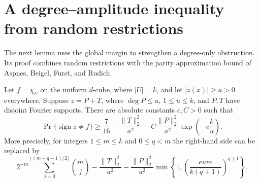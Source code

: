 \section{A degree--amplitude inequality from random restrictions}
\label{sec:random-restriction}
The next lemma uses the global margin to strengthen a degree-only
obstruction. Its proof combines random restrictions with the parity
approximation bound of Aspnes, Beigel, Furst, and Rudich.

\begin{lemma}
\label{cor:restriction-amplitude}
\label{lem:random-restriction-exact}
Let $f=\chi_U$ on the uniform $d$-cube, where $|U|=k$, and let
$|z(x)|\ge a>0$ everywhere. Suppose $z=P+T$, where $\deg P\le u$,
$1\le u\le k$, and $P,T$ have disjoint Fourier supports. There are
absolute constants $c,C>0$ such that
\begin{equation}
 \Pr\{\operatorname{sign}z\ne f\}
 \ge \frac7{16}-\frac{\|T\|_2^2}{a^2}
       -C\frac{\|P\|_2^2}{a^2}\exp\!\left(-c\frac{k}{u}\right).
 \label{eq:restriction-amplitude}
\end{equation}
More precisely, for integers $1\le m\le k$ and $0\le q<m$ the right-hand
side can be replaced by
\begin{equation}
 2^{-m}\sum_{j=0}^{\lfloor(m-q-1)/2\rfloor}\binom mj
 -\frac{\|T\|_2^2}{a^2}
 -\frac{\|P\|_2^2}{a^2}
    \min\!\left\{1,
       \left(\frac{eum}{k(q+1)}\right)^{q+1}\right\}.
 \label{eq:restriction-exact}
\end{equation}
\end{lemma}

